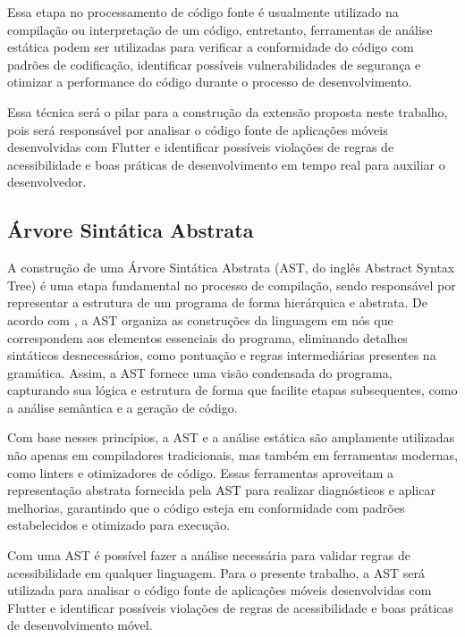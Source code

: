 Essa etapa no processamento de código fonte é usualmente utilizado na compilação ou interpretação de um código, entretanto, ferramentas de análise estática podem ser utilizadas para verificar a conformidade do código com padrões de codificação, identificar possíveis vulnerabilidades de segurança e otimizar a performance do código durante o processo de desenvolvimento.

Essa técnica será o pilar para a construção da extensão proposta neste trabalho, pois será responsável por analisar o código fonte de aplicações móveis desenvolvidas com Flutter e identificar possíveis violações de regras de acessibilidade e boas práticas de desenvolvimento em tempo real para auxiliar o desenvolvedor.

\subsection{Árvore Sintática Abstrata}

A construção de uma Árvore Sintática Abstrata (AST, do inglês Abstract Syntax Tree) é uma etapa fundamental no processo de compilação, sendo responsável por representar a estrutura de um programa de forma hierárquica e abstrata. De acordo com \cite{compiladores}, a AST organiza as construções da linguagem em nós que correspondem aos elementos essenciais do programa, eliminando detalhes sintáticos desnecessários, como pontuação e regras intermediárias presentes na gramática. Assim, a AST fornece uma visão condensada do programa, capturando sua lógica e estrutura de forma que facilite etapas subsequentes, como a análise semântica e a geração de código.

Com base nesses princípios, a AST e a análise estática são amplamente utilizadas não apenas em compiladores tradicionais, mas também em ferramentas modernas, como linters e otimizadores de código. Essas ferramentas aproveitam a representação abstrata fornecida pela AST para realizar diagnósticos e aplicar melhorias, garantindo que o código esteja em conformidade com padrões estabelecidos e otimizado para execução.

Com uma AST é possível fazer a análise necessária para validar regras de acessibilidade em qualquer linguagem. Para o presente trabalho, a AST será utilizada para analisar o código fonte de aplicações móveis desenvolvidas com Flutter e identificar possíveis violações de regras de acessibilidade e boas práticas de desenvolvimento móvel.